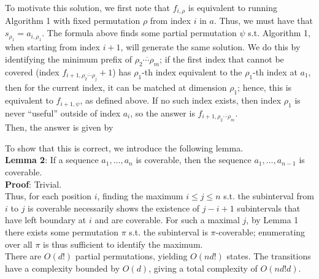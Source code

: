 \documentclass{article}
\begin{document}
  To motivate this solution, we first note that $f_{i,\rho}$ is equivalent to running Algorithm 1 with fixed permutation $\rho$ from index $i$ in $a$. Thus, we must have that $s_{\rho_1}=a_{i,\rho_1}$. The formula above finds some partial permutation $\psi$ s.t. Algorithm 1, when starting from index $i+1$, will generate the same solution. We do this by identifying the minimum prefix of $\overline{\rho_2\cdots\rho_m}$; if the first index that cannot be covered (index $f_{i+1,\overline{\rho_2\cdots\rho_j}}+1$) has $\rho_1$-th index equivalent to the $\rho_1$-th index at $a_1$, then for the current index, it can be matched at dimension $\rho_1$; hence, this is equivalent to $f_{i+1,\psi}$, as defined above. If no such index exists, then index $\rho_1$ is never ``useful'' outside of index $a_i$, so the answer is $f_{i+1,\overline{\rho_2\cdots\rho_m}}$. \\


  Then, the answer is given by

  To show that this is correct, we introduce the following lemma. \\

  \textbf{Lemma 2}: If a sequence $a_1,\dots,a_n$ is coverable, then the sequence $a_1,\dots,a_{n-1}$ is coverable. \\
  \textbf{Proof}: Trivial. \\

  Thus, for each position $i$, finding the maximum $i\leq j\leq n$ s.t. the subinterval from $i$ to $j$ is coverable necessarily shows the existence of $j-i+1$ subintervals that have left boundary at $i$ and are coverable. For such a maximal $j$, by Lemma 1 there exists some permutation $\pi$ s.t. the subinterval is $\pi$-coverable; enumerating over all $\pi$ is thus sufficient to identify the maximum. \\

  There are $O(d!)$ partial permutations, yielding $O(nd!)$ states. The transitions have a complexity bounded by $O(d)$, giving a total complexity of $O(nd!d)$.
  
\end{document}
